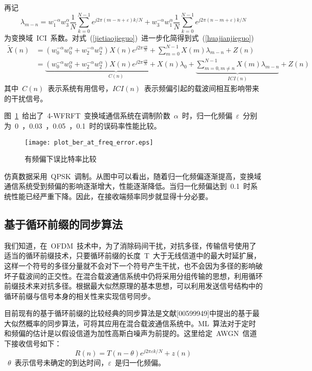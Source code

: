 再记
\begin{equation}
{\lambda _{m - n}} = w_1^{ - \alpha }w_3^\alpha \frac{1}{N}\sum\limits_{k = 0}^{N - 1} {{e^{j2\pi (m - n + \varepsilon )k/N}}}  + w_3^{ - \alpha }w_1^\alpha \frac{1}{N}\sum\limits_{k = 0}^{N - 1} {{e^{j2\pi (n - m + \varepsilon )k/N}}}
\end{equation}
为变换域~ICI~系数。对式~(\ref{jietiaojieguo})~进一步化简得到式~(\ref{huajianjieguo})~
\begin{align}\label{huajianjieguo}
\tilde X(n) &= (w_0^{ - \alpha }w_0^\alpha  + w_2^{ - \alpha }w_2^\alpha )X(n){e^{j2\pi \frac{{\varepsilon n}}{N}}} + \sum\limits_{m = 0}^{N - 1} {X(m){\lambda _{m - n}}}  + Z(n) \nonumber \\
&= \underbrace {(w_0^{ - \alpha }w_0^\alpha  + w_2^{ - \alpha }w_2^\alpha )X(n){e^{j2\pi \frac{{\varepsilon n}}{N}}} + X(n){\lambda _0}}_{C(n)} + \underbrace {\sum\limits_{m = 0,m \ne n}^{N - 1} {X(m){\lambda _{m - n}}} }_{ICI(n)} + Z(n)
\end{align}
其中~$C(n)$~表示系统有用信号，$ICI(n)$~表示频偏引起的载波间相互影响带来的干扰信号。

图~\ref{plot_ber_at_freq_error}~给出了~4-WFRFT~变换域通信系统在调制阶数~$\alpha$~时，归一化频偏~$\varepsilon$~分别为~0~，0.03~，0.05~，0.1~时的误码率性能比较。
\begin{figure}[htbp]
\centering
\texttt{[image: plot\_ber\_at\_freq\_error.eps]}
\caption{有频偏下误比特率比较}\vspace{-1em}\label{plot_ber_at_freq_error}
\end{figure}
仿真数据采用~QPSK~调制。从图中可以看出，随着归一化频偏逐渐提高，变换域通信系统受到频偏的影响逐渐增大，性能逐渐降低。当归一化频偏达到~0.1~时系统性能已经严重下降。因此，在接收端频率同步就显得十分必要。


\subsection{基于循环前缀的同步算法}


我们知道，在~OFDM~技术中，为了消除码间干扰，对抗多径，传输信号使用了适当的循环前缀技术，只要循环前缀的长度~T~大于无线信道中的最大时延扩展，这样一个符号的多径分量就不会对下一个符号产生干扰，也不会因为多径的影响破坏子载波间的正交性。在混合载波通信系统中仍将采用分组传输的思想，利用循环前缀技术来对抗多径。根据最大似然原理的基本思想，可以利用发送信号结构中的循环前缀与信号本身的相关性来实现信号同步。

目前现有的基于循环前缀的比较经典的同步算法是文献[00599949]中提出的基于最大似然概率的同步算法，可将其应用在混合载波通信系统中。ML~算法对于定时和频偏的估计是以假设信道为加性高斯白噪声为前提的。这里给定~AWGN~信道下接收信号如下：
\begin{equation}
R(n) = T(n-\theta){e^{j2\pi \varepsilon k/N} } + z(n)
\end{equation}
~$\theta$~表示信号未确定的到达时间，$\varepsilon$~是归一化频偏。

